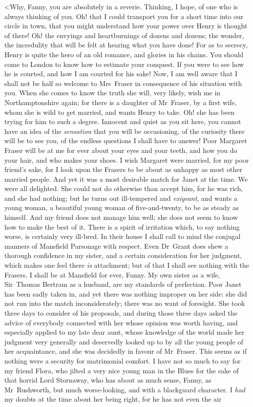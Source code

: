 <Why, Fanny, you are absolutely in a reverie. Thinking, I hope, of one who is always thinking of you. Oh! that I could transport you for a short time into our circle in town, that you might understand how your power over Henry is thought of there! Oh! the envyings and heartburnings of dozens and dozens; the wonder, the incredulity that will be felt at hearing what you have done! For as to secrecy, Henry is quite the hero of an old romance, and glories in his chains. You should come to London to know how to estimate your conquest. If you were to see how he is courted, and how I am courted for his sake! Now, I am well aware that I shall not be half so welcome to Mrs~Fraser in consequence of his situation with you. When she comes to know the truth she will, very likely, wish me in Northamptonshire again; for there is a daughter of Mr~Fraser, by a first wife, whom she is wild to get married, and wants Henry to take. Oh! she has been trying for him to such a degree. Innocent and quiet as you sit here, you cannot have an idea of the \textit{sensation}  that you will be occasioning, of the curiosity there will be to see you, of the endless questions I shall have to answer! Poor Margaret Fraser will be at me for ever about your eyes and your teeth, and how you do your hair, and who makes your shoes. I wish Margaret were married, for my poor friend's sake, for I look upon the Frasers to be about as unhappy as most other married people. And yet it was a most desirable match for Janet at the time. We were all delighted. She could not do otherwise than accept him, for he was rich, and she had nothing; but he turns out ill-tempered and \textit{exigeant}, and wants a young woman, a beautiful young woman of five-and-twenty, to be as steady as himself. And my friend does not manage him well; she does not seem to know how to make the best of it. There is a spirit of irritation which, to say nothing worse, is certainly very ill-bred. In their house I shall call to mind the conjugal manners of Mansfield Parsonage with respect. Even Dr~Grant does shew a thorough confidence in my sister, and a certain consideration for her judgment, which makes one feel there \textit{is}  attachment; but of that I shall see nothing with the Frasers. I shall be at Mansfield for ever, Fanny. My own sister as a wife, Sir~Thomas Bertram as a husband, are my standards of perfection. Poor Janet has been sadly taken in, and yet there was nothing improper on her side: she did not run into the match inconsiderately; there was no want of foresight. She took three days to consider of his proposals, and during those three days asked the advice of everybody connected with her whose opinion was worth having, and especially applied to my late dear aunt, whose knowledge of the world made her judgment very generally and deservedly looked up to by all the young people of her acquaintance, and she was decidedly in favour of Mr~Fraser. This seems as if nothing were a security for matrimonial comfort. I have not so much to say for my friend Flora, who jilted a very nice young man in the Blues for the sake of that horrid Lord Stornaway, who has about as much sense, Fanny, as Mr~Rushworth, but much worse-looking, and with a blackguard character. I \textit{had}  my doubts at the time about her being right, for he has not even the air 